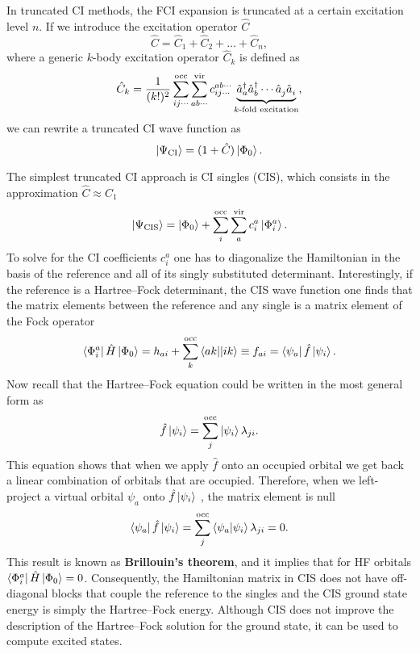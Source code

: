 \documentclass[../Main/chem532-notes.tex]{subfiles}
\begin{document}
In truncated CI methods, the FCI expansion is truncated at a certain excitation level $n$.
If we introduce the excitation operator $\hat{C}$
\begin{equation}
\hat{C} = \hat{C}_1 + \hat{C}_2 + \ldots + \hat{C}_n,
\end{equation}
where a generic $k$-body excitation operator $\hat{C}_k$ is defined as
\begin{equation}
 \hat{C}_k = \frac{1}{(k!)^2} \sum_{ij\cdots}^{\mathrm{occ}} \sum_{ab\cdots}^{\mathrm{vir}} c_{ij\cdots}^{ab\cdots} \underbrace{\hat{a}_{a}^{\dagger} \hat{a}_{b}^{\dagger} \cdots \hat{a}_{j}^{\,} \hat{a}_{i}^{\,}}_{k\text{-fold excitation}},
\end{equation}
we can rewrite a truncated CI wave function as
\begin{equation}
\ket{\Psi_{\mathrm{CI}}} = (1 + \hat{C}) \ket{\Phi_0}.
\end{equation}

The simplest truncated CI approach is CI singles (CIS), which consists in the approximation $\hat{C} \approx \hat{C}_1$
\begin{equation}
\ket{\Psi_{\mathrm{CIS}}} = 
\ket{\Phi_0}
+ \sum_{i}^{\mathrm{occ}} \sum_{a}^{\mathrm{vir}} c_i^a \ket{\Phi_{i}^{a}}.
\end{equation}
To solve for the CI coefficients $c_i^a$ one has to diagonalize the Hamiltonian in the basis of the reference and all of its singly substituted determinant.
Interestingly, if the reference is a Hartree--Fock determinant, the CIS wave function one finds that the matrix elements between the reference and any single is a matrix element of the Fock operator
\begin{equation}
\bra{\Phi_{i}^{a}} \hat{H} \ket{\Phi_0} = h_{ai} + \sum_{k}^{\mathrm{occ}} \bra{ak}\!\ket{ik} \equiv f_{ai} = \bra{\psi_a} \hat{f} \ket{\psi_i}.
\end{equation}
Now recall that the Hartree--Fock equation could be written in the most general form as
\begin{equation}
\hat{f} \ket{\psi_i} = \sum_{j}^{\mathrm{occ}}  \ket{\psi_i} \lambda_{ji}.
\end{equation}
This equation shows that when we apply $\hat{f}$ onto an occupied orbital we get back a linear combination of orbitals that are occupied. Therefore, when we left-project a virtual orbital $\psi_a$ onto  $\hat{f} \ket{\psi_i}$ , the matrix element is null
\begin{equation}
\bra{\psi_a}\hat{f} \ket{\psi_i} = \sum_{j}^{\mathrm{occ}}  \braket{\psi_a|\psi_i} \lambda_{ji} = 0.
\end{equation}
This result is known as \textbf{Brillouin's theorem}, and it implies that for HF orbitals $\bra{\Phi_{i}^{a}} \hat{H} \ket{\Phi_0} = 0$.
Consequently, the Hamiltonian matrix in CIS does not have off-diagonal blocks that couple the reference to the singles and the CIS ground state energy is simply the Hartree--Fock energy.
Although CIS does not improve the description of the Hartree--Fock solution for the ground state, it can be used to compute excited states.
\end{document}
